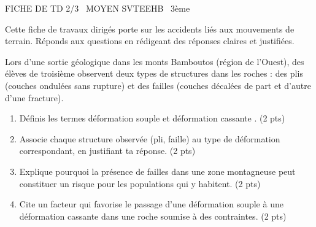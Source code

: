 \documentclass[11pt]{article}
\begin{document}
\begin{tcolorbox}[enhanced,colback=popink,colframe=popink,arc=10pt,boxrule=0pt,left=12pt,right=12pt,top=9pt,bottom=9pt]
{\color{white}\popxbold\small FICHE DE TD 2/3 \textbullet\ MOYEN \hfill SVTEEHB \textbullet\ 3ème\par}
\end{tcolorbox}
\vspace{4pt}
Cette fiche de travaux dirigés porte sur les accidents liés aux mouvements de terrain. Réponds aux questions en rédigeant des réponses claires et justifiées.

\begin{exercice}
Lors d'une sortie géologique dans les monts Bamboutos (région de l'Ouest), des élèves de troisième observent deux types de structures dans les roches : des plis (couches ondulées sans rupture) et des failles (couches décalées de part et d'autre d'une fracture).
\begin{enumerate}
\item Définis les termes \og déformation souple \fg{} et \og déformation cassante \fg. \hfill (2 pts)
\item Associe chaque structure observée (pli, faille) au type de déformation correspondant, en justifiant ta réponse. \hfill (2 pts)
\item Explique pourquoi la présence de failles dans une zone montagneuse peut constituer un risque pour les populations qui y habitent. \hfill (2 pts)
\item Cite un facteur qui favorise le passage d'une déformation souple à une déformation cassante dans une roche soumise à des contraintes. \hfill (2 pts)
\end{enumerate}
\end{exercice}
\end{document}
